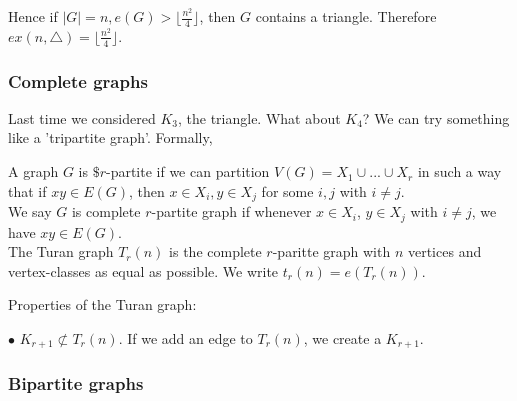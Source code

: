 \documentclass[a4paper]{article}
\begin{document}
Hence if $|G| = n, e(G) > \lfloor \frac{n^2}{4}\rfloor$, then $G$ contains a triangle. Therefore $ex(n,\triangle) = \lfloor\frac{n^2}{4}\rfloor$.

\subsubsection{Complete graphs}

Last time we considered $K_3$, the triangle. What about $K_4$? We can try something like a 'tripartite graph'. Formally,

\begin{defi}
A graph $G$ is $\$r$-partite if we can partition $V(G) = X_1 \cup ... \cup X_r$ in such a way that if $xy \in E(G)$, then $x \in X_i, y \in X_j$ for some $i,j$ with $i \neq j$.\\
We say $G$ is complete $r$-partite graph if whenever $x \in X_i$, $y \in X_j$ with $i \neq j$, we have $xy \in E(G)$.\\
The Turan graph $T_r(n)$ is the complete $r$-paritte graph with $n$ vertices and vertex-classes as equal as possible. We write $t_r(n) = e(T_r(n))$.
\end{defi}

Properties of the Turan graph:

$\bullet$ $K_{r+1} \not\subset T_r(n)$. If we add an edge to $T_r(n)$, we create a $K_{r+1}$.

\subsubsection{Bipartite graphs}
\end{document}
